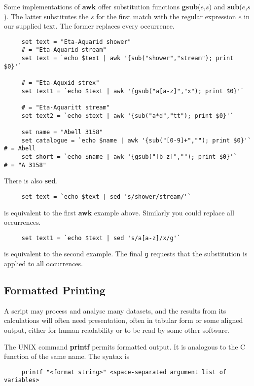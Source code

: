 \documentclass[twoside,11pt]{article}
\newcommand{\htmlref}[2]{#1}
\newcommand{\xlabel}[1]{}
\begin{document}
Some implementations of {\bf awk} offer substitution functions {\bf
gsub}($e$,$s$) and {\bf sub}($e$,$s$).  The latter substitutes the $s$
for the first match with the \htmlref{{\sf regular
expression}}{sc4_gl_reg_exp} $e$ in our supplied text.  The former
replaces every occurrence.

\small
\begin{verbatim}
     set text = "Eta-Aquarid shower"
     # = "Eta-Aquarid stream"
     set text = `echo $text | awk '{sub("shower","stream"); print $0}'` 
     
     # = "Eta-Aquxid strex"
     set text1 = `echo $text | awk '{gsub("a[a-z]","x"); print $0}'`

     # = "Eta-Aquaritt stream"
     set text2 = `echo $text | awk '{sub("a*d","tt"); print $0}'`

     set name = "Abell 3158"
     set catalogue = `echo $name | awk '{sub("[0-9]+",""); print $0}'`  # = Abell
     set short = `echo $name | awk '{gsub("[b-z]",""); print $0}'`      # = "A 3158"
\end{verbatim}
\normalsize

There is also {\bf sed}.
\small
\begin{verbatim}
     set text = `echo $text | sed 's/shower/stream/'`
\end{verbatim}
\normalsize
is equivalent to the first {\bf awk} example above.  Similarly you could
replace all occurrences.

\small
\begin{verbatim}
     set text1 = `echo $text | sed 's/a[a-z]/x/g'`
\end{verbatim}
\normalsize
is equivalent to the second example.  The final {\tt g} requests that the
substitution is applied to all occurrences.

\subsection{\xlabel{sc4_se_form_print}Formatted Printing
\label{sc4_se_form_print}}

A script may process and analyse many datasets, and the results from
its calculations will often need presentation, often in tabular form
or some aligned output, either for human readability or to be read by
some other software.

The UNIX command {\bf printf} permits formatted output.  It is
analogous to the C function of the same name.  The syntax is

\small
\begin{verbatim}
     printf "<format string>" <space-separated argument list of variables>
\end{verbatim}
\normalsize
\end{document}
